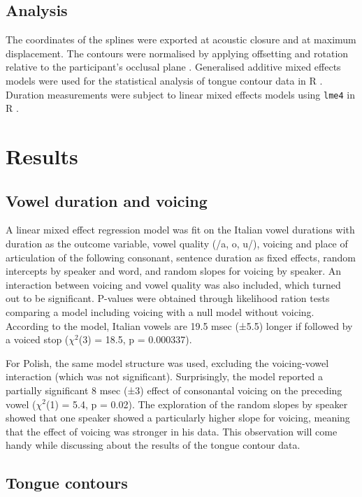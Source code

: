 \documentclass[]{elsarticle}
\begin{document}
\subsection{Analysis}\label{analysis}

The coordinates of the splines were exported at acoustic closure and at
maximum displacement. The contours were normalised by applying
offsetting and rotation relative to the participant's occlusal plane
\citep{scobbie2011}. Generalised additive mixed effects models
\citep{wood2006} were used for the statistical analysis of tongue
contour data in R \citep{r-core-team2017}. Duration measurements were
subject to linear mixed effects models using \texttt{lme4} in R
\citep{bates2015}.

\section{Results}\label{results}

\subsection{Vowel duration and
voicing}\label{vowel-duration-and-voicing}

A linear mixed effect regression model was fit on the Italian vowel
durations with duration as the outcome variable, vowel quality (/a, o,
u/), voicing and place of articulation of the following consonant,
sentence duration as fixed effects, random intercepts by speaker and
word, and random slopes for voicing by speaker. An interaction between
voicing and vowel quality was also included, which turned out to be
significant. P-values were obtained through likelihood ration tests
comparing a model including voicing with a null model without voicing.
According to the model, Italian vowels are 19.5 msec (±5.5) longer if
followed by a voiced stop (\(\chi^2\)(3) = 18.5, p = 0.000337).

For Polish, the same model structure was used, excluding the
voicing-vowel interaction (which was not significant). Surprisingly, the
model reported a partially significant 8 msec (±3) effect of consonantal
voicing on the preceding vowel (\(\chi^2\)(1) = 5.4, p = 0.02). The
exploration of the random slopes by speaker showed that one speaker
showed a particularly higher slope for voicing, meaning that the effect
of voicing was stronger in his data. This observation will come handy
while discussing about the results of the tongue contour data.

\subsection{Tongue contours}\label{tongue-contours}
\end{document}
